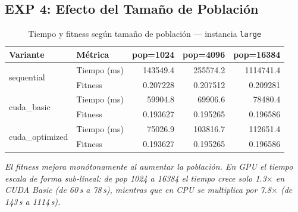 \subsection{EXP 4: Efecto del Tamaño de Población}

\begin{table}[H]
  \centering
  \caption{Tiempo y fitness según tamaño de población — instancia \texttt{large}}
  \label{tab:exp4}
  \begin{tabular}{llrrr}
    \toprule
    \textbf{Variante} & \textbf{Métrica} &
    \textbf{pop=1024} & \textbf{pop=4096} & \textbf{pop=16384} \\
    \midrule
    \multirow{2}{*}{sequential}
        & Tiempo (ms) & 143549.4 & 255574.2 & 1114741.4 \\
        & Fitness     & 0.207228 & 0.207512 & 0.209281 \\
    \midrule
    \multirow{2}{*}{cuda\_basic}
        & Tiempo (ms) & 59904.8  & 69906.6  & 78480.4 \\
        & Fitness     & 0.193627 & 0.195265 & 0.196586 \\
    \midrule
    \multirow{2}{*}{cuda\_optimized}
        & Tiempo (ms) & 75026.9  & 103816.7 & 112651.4 \\
        & Fitness     & 0.193627 & 0.195265 & 0.196586 \\
    \bottomrule
  \end{tabular}
\end{table}
\noindent\textit{El fitness mejora monótonamente al aumentar la población. En
GPU el tiempo escala de forma sub-lineal: de pop 1024 a 16384 el tiempo crece
solo 1.3$\times$ en CUDA Basic (de 60\,s a 78\,s), mientras que en CPU se
multiplica por 7.8$\times$ (de 143\,s a 1114\,s).}